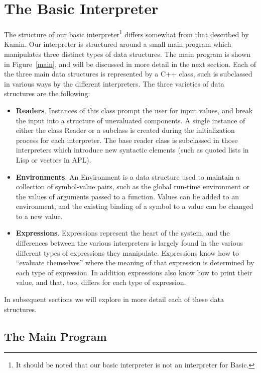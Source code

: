 \chapter{The Basic Interpreter}

The structure of our basic interpreter\footnote{It should be noted that our
basic interpreter is not an interpreter for Basic.}
differs somewhat from that described
by Kamin.  Our interpreter is structured around a small main program which
manipulates three distinct types of data structures.  The main program is
shown in Figure~\ref{main}, and will be discussed in more detail in the
next section.  
Each of the three main data structures is represented by a C++ class, such
is subclassed in various ways by the different interpreters.
The three varieties of data structures are the following:
\begin{itemize}
\item
{\bf Readers}.  
Instances of this class prompt the user for input values,
and break the input into a structure of unevaluated components.
A single instance of either the class {\sf Reader} or a subclass
is created during the initialization
process for each interpreter.  The base reader class is subclassed in those
interpreters which introduce new syntactic elements (such as quoted lists
in Lisp or vectors in APL).
\item
{\bf Environments}.
An Environment is a data structure used to maintain a collection of
symbol-value pairs, such as the global run-time environment or the values
of arguments passed to a function.  Values can be added to an environment,
and the existing binding of a symbol to a value can be changed to a new
value.
\item
{\bf Expressions}.
Expressions represent the heart of the system, and the differences between
the various interpreters is largely found in the various different types of
expressions they manipulate.  Expressions know how to ``evaluate
themselves'' where the meaning of that expression is determined by each
type of expression.  In addition expressions also know how to print their
value, and that, too, differs for each type of expression.
\end{itemize}

In subsequent sections we will explore in more detail each of these data
structures.

\section{The Main Program}

